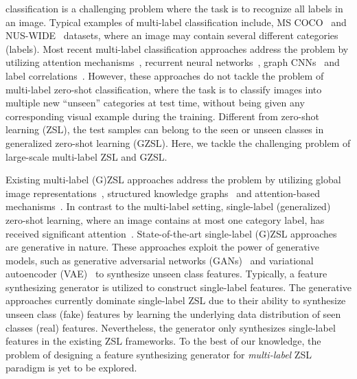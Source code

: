 \documentclass[10pt,journal,compsoc]{IEEEtran}
\begin{document}

 classification is a challenging problem where the task is to recognize all labels in an image.
Typical examples of multi-label classification include, MS COCO~\cite{coco} and NUS-WIDE~\cite{nuswide} datasets, where an image may contain several different categories (labels). Most recent multi-label classification approaches address the problem by utilizing attention mechanisms~\cite{wang2017multi,yeattention,you2020cross}, recurrent neural networks~\cite{wang2016cnn,yazici2020orderless,nam2017maximizing}, graph CNNs~\cite{kipf2016semi,chen2019multi} and label correlations~\cite{weston2011wsabie,durand2019learning}. However, these approaches do not tackle the problem of multi-label zero-shot classification, where the task is to classify images into multiple new ``unseen'' categories at test time, without being given any corresponding visual example during the training. 
Different from zero-shot learning (ZSL), the test samples can belong to the seen or unseen classes in generalized zero-shot learning (GZSL). Here, we tackle the challenging problem of large-scale multi-label ZSL and GZSL. 










Existing multi-label (G)ZSL approaches address the problem by utilizing global image representations~\cite{mensink2014costa,zhang2016fast}, structured knowledge graphs~\cite{lee2018multi} and attention-based mechanisms~\cite{huynh2020shared}. In contrast to the multi-label setting, single-label (generalized) zero-shot learning, where an image contains at most one category label, has received significant attention~\cite{jayaraman14nips,fu15pami,frome13nips,romera15icml,rohrbach13nips,Ye17cvpr,akata2015label,zsl-good-bad-ugly,xian2018feature,xian2019f}. State-of-the-art single-label (G)ZSL approaches~\cite{xian2018feature,Rafael18eccv,li19leveraging,huang19generative,Mandal19cvpr,xian2019f,narayan2020latent} are generative in nature. These approaches exploit the power of generative models, such as generative adversarial networks (GANs)~\cite{gan} and variational autoencoder (VAE)~\cite{kingma13iclr} to synthesize unseen class features. Typically, a feature synthesizing generator is utilized to construct single-label features. The generative approaches currently dominate single-label ZSL due to their ability to synthesize unseen class (fake) features by learning the underlying data distribution of seen classes (real) features. Nevertheless, the generator only synthesizes single-label features in the existing ZSL frameworks. To the best of our knowledge, the problem of designing a feature synthesizing generator for \textit{multi-label} ZSL paradigm is yet to be explored.
\end{document}
